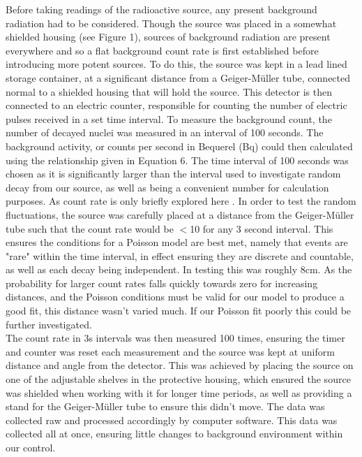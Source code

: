 \documentclass[11pt]{article}
\begin{document}
    Before taking readings of the radioactive source, any present background radiation had to be considered. Though the source was placed in a somewhat shielded housing (see Figure 1), sources of background radiation are present everywhere and so a flat background count rate is first established before introducing more potent sources. To do this, the source was kept in a lead lined storage container, at a significant distance from a Geiger-Müller tube, connected normal to a shielded housing that will hold the source. This detector is then connected to an electric counter, responsible for counting the number of electric pulses received in a set time interval. To measure the background count, the number of decayed nuclei was measured in an interval of 100 seconds. The background activity, or counts per second in Bequerel (Bq) could then calculated using the relationship given in Equation 6. The time interval of 100 seconds was chosen as it is significantly larger than the interval used to investigate random decay from our source, as well as being a convenient number for calculation purposes. As count rate is only briefly explored here . \newline
    In order to test the random fluctuations, the  source was carefully placed at a distance from the Geiger-Müller tube such that the count rate would be $<$10 for any 3 second interval. This ensures the conditions for a Poisson model are best met, namely that events are "rare" within the time interval, in effect ensuring they are discrete and countable, as well as each decay being independent. In testing this was roughly 8cm. As the probability for larger count rates falls quickly towards zero for increasing distances, and the Poisson conditions must be valid for our model to produce a good fit, this distance wasn't varied much. If our Poisson fit poorly this could be further investigated.  \\
    The count rate in 3s intervals was then measured 100 times, ensuring the timer and counter was reset each measurement and the source was kept at uniform distance and angle from the detector. This was achieved by placing the source on one of the adjustable shelves in the protective housing, which ensured the source was shielded when working with it for longer time periods, as well as providing a stand for the Geiger-Müller tube to ensure this didn't move. The data was collected raw and processed accordingly by computer software. This data was collected all at once, ensuring little changes to background environment within our control. 
\end{document}
